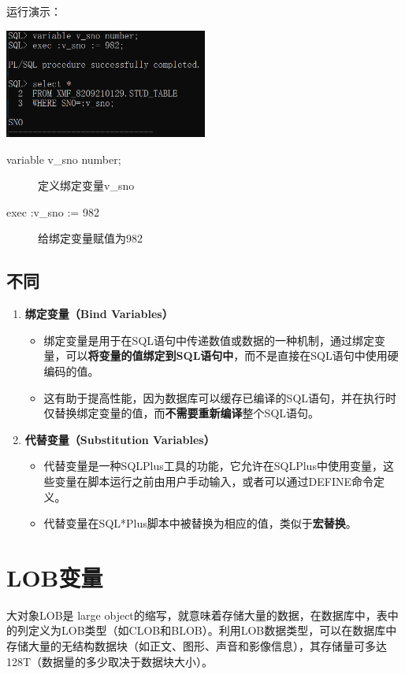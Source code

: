 \documentclass[11pt, a4paper, oneside, UTF8]{ctexbook}
\let\kaishu\relax %
\begin{document}
运行演示：
\begin{center}
  \begin{minipage}{\textwidth}
    \center
    \includegraphics[width=0.5\textwidth]{picture/绑定变量效果.png}
    \captionsetup{hypcap=false}
    \label{fig:绑定变量效果}
  \end{minipage}
\end{center}
\begin{description}
  \item[variable v\_sno number;] 定义绑定变量v\_sno
  \item[exec :v\_sno := 982] 给绑定变量赋值为982
\end{description}

\subsection{不同}

\begin{enumerate}
  \item {\bfseries\kaishu 绑定变量（Bind Variables）}
  \begin{itemize}
    \item 绑定变量是用于在SQL语句中传递数值或数据的一种机制，通过绑定变量，可以\textbf{将变量的值绑定到SQL语句中}，而不是直接在SQL语句中使用硬编码的值。
    \item 这有助于提高性能，因为数据库可以缓存已编译的SQL语句，并在执行时仅替换绑定变量的值，而\textbf{不需要重新编译}整个SQL语句。
  \end{itemize}
  \item {\bfseries\kaishu 代替变量（Substitution Variables）}
  \begin{itemize}
    \item 代替变量是一种SQLPlus工具的功能，它允许在SQLPlus中使用变量，这些变量在脚本运行之前由用户手动输入，或者可以通过DEFINE命令定义。
    \item 代替变量在SQL*Plus脚本中被替换为相应的值，类似于\textbf{宏替换}。
  \end{itemize}
\end{enumerate}
\section{LOB变量}
大对象LOB是 large object的缩写，就意味着存储大量的数据，在数据库中，表中的列定义为LOB类型（如CLOB和BLOB）。利用LOB数据类型，可以在数据库中存储大量的无结构数据块（如正文、图形、声音和影像信息），其存储量可多达128T（数据量的多少取决于数据块大小）。
\end{document}
